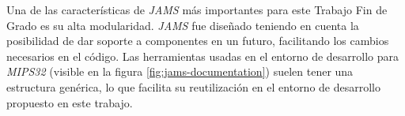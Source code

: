 Una de las características de \textit{JAMS} más importantes
para este Trabajo Fin de Grado es su alta modularidad.
\textit{JAMS} fue diseñado teniendo en cuenta la posibilidad
de dar soporte a componentes en un futuro, facilitando los cambios
necesarios en el código.
Las herramientas usadas en el entorno de desarrollo para
\textit{MIPS32} (visible en la figura \ref{fig:jams-documentation})
suelen tener una estructura genérica,
lo que facilita su reutilización en el entorno de desarrollo
propuesto en este trabajo.